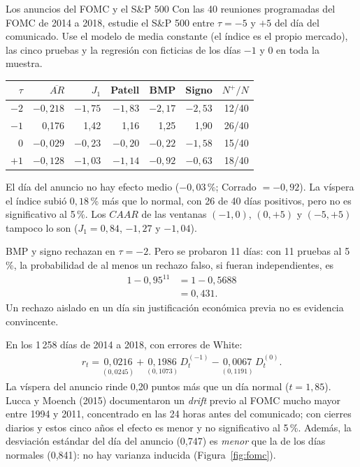 \begin{ejresuelto}{Los anuncios del FOMC y el S\&P 500}\label{ej:fomc}
\enunciado Con las 40 reuniones programadas del FOMC de 2014 a 2018, estudie el S\&P 500 entre $\tau=-5$ y $+5$ del día del
comunicado. Use el modelo de media constante (el índice es el propio mercado), las cinco pruebas y la regresión con ficticias
de los días $-1$ y $0$ en toda la muestra.

\solucion
{}
\begin{center}\small
\begin{tabular}{@{}rrrrrrr@{}}
\toprule
$\tau$ & $\overline{AR}$ & $J_1$ & Patell & BMP & Signo & $N^+/N$ \\
\midrule
$-2$ & $-0{,}218$ & $-1{,}75$ & $-1{,}83$ & $-2{,}17$ & $-2{,}53$ & 12/40 \\
$-1$ & 0,176 & 1,42 & 1,16 & 1,25 & 1,90 & 26/40 \\
0    & $-0{,}029$ & $-0{,}23$ & $-0{,}20$ & $-0{,}22$ & $-1{,}58$ & 15/40 \\
$+1$ & $-0{,}128$ & $-1{,}03$ & $-1{,}14$ & $-0{,}92$ & $-0{,}63$ & 18/40 \\
\bottomrule
\end{tabular}
\end{center}
El día del anuncio no hay efecto medio ($-0{,}03$\,\%; Corrado $=-0{,}92$). La víspera el índice subió $0{,}18$\,\% más que lo
normal, con 26 de 40 días positivos, pero no es significativo al 5\,\%. Los $CAAR$ de las ventanas $(-1,0)$, $(0,+5)$ y $(-5,+5)$
tampoco lo son ($J_1=0{,}84$, $-1{,}27$ y $-1{,}04$).

 BMP y signo rechazan en $\tau=-2$. Pero se probaron 11 días: con 11 pruebas al 5\,\%,
la probabilidad de al menos un rechazo falso, si fueran independientes, es
\begin{align*}
  1-0{,}95^{11} &= 1-0{,}5688\\
               &= 0{,}431 .
\end{align*}
Un rechazo aislado en un día sin justificación económica previa no es evidencia convincente.

 En los 1\,258 días de 2014 a 2018, con errores de White:
\begin{align*}
  r_t = \underset{(0{,}0245)}{0{,}0216}+\underset{(0{,}1073)}{0{,}1986}\,D_t^{(-1)}-\underset{(0{,}1191)}{0{,}0067}\,D_t^{(0)} .
\end{align*}
La víspera del anuncio rinde 0,20 puntos más que un día normal ($t=1{,}85$). Lucca y Moench (2015) documentaron un
\emph{drift} previo al FOMC mucho mayor entre 1994 y 2011, concentrado en las 24 horas antes del comunicado; con cierres
diarios y estos cinco años el efecto es menor y no significativo al 5\,\%. Además, la desviación estándar del día del anuncio
(0,747) es \emph{menor} que la de los días normales (0,841): no hay varianza inducida (Figura~\ref{fig:fomc}).


\end{ejresuelto}
